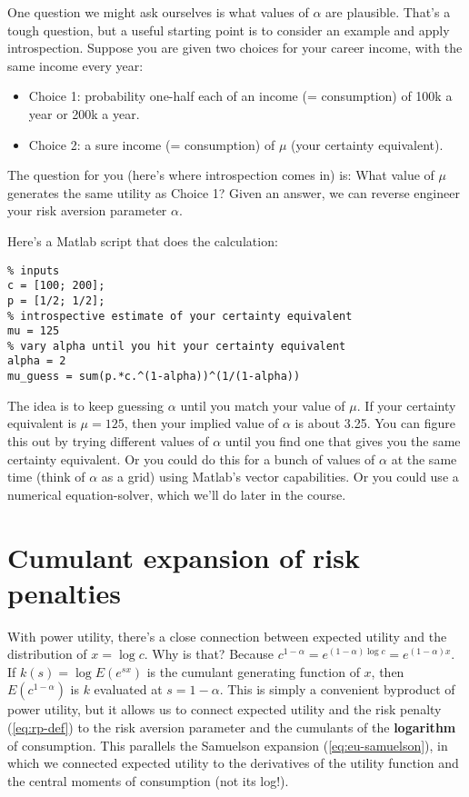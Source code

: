 \documentclass[11pt]{article}
\begin{document}
One question we might ask ourselves is what values of $\alpha$ are plausible.
That's a tough question,
but a useful starting point is to consider an example and apply introspection.
Suppose you are given two choices for your career income, with the same
income every year:
\begin{itemize}
\item Choice 1:  probability one-half each of an income (= consumption)
of 100k a year or 200k a year.
\item Choice 2:  a sure income (= consumption) of $\mu$ (your certainty equivalent).
\end{itemize}
The question for you (here's where introspection comes in) is:
What value of $\mu$ generates the same utility as Choice 1?
Given an answer, we can reverse engineer your risk aversion
parameter $\alpha$.

Here's a Matlab script that does the calculation:
\begin{verbatim}
% inputs
c = [100; 200];
p = [1/2; 1/2];
% introspective estimate of your certainty equivalent
mu = 125
% vary alpha until you hit your certainty equivalent
alpha = 2
mu_guess = sum(p.*c.^(1-alpha))^(1/(1-alpha))
\end{verbatim}
The idea is to keep guessing $\alpha$ until you match your value of $\mu$.
If your certainty equivalent is $\mu = 125$, then
your implied value of $\alpha$ is about 3.25.
You can figure this out by trying different values of $\alpha$
until you find one that gives you the same certainty equivalent.
Or you could do this for a bunch of values of $\alpha$ at the same time
(think of $\alpha$ as a grid)
using Matlab's vector capabilities.
Or you could use a numerical equation-solver,
which we'll do later in the course.


\section{Cumulant expansion of risk penalties}

With power utility, there's a close connection between expected
utility and the distribution of $ x = \log c$.
Why is that?
Because $c^{1-\alpha} = e^{(1-\alpha) \log c} = e^{(1-\alpha) x }$.
If $k(s) = \log E (e^{sx})$ is the cumulant generating function of $x$,
then $E(c^{1-\alpha})$  is $k$ evaluated at $ s = 1-\alpha$.
This is simply a convenient byproduct of  power utility,
but it allows us to connect expected utility and the risk penalty (\ref{eq:rp-def})
to the risk aversion parameter and the cumulants of the {\bf logarithm} of consumption.
This parallels the Samuelson expansion (\ref{eq:eu-samuelson}),
in which we connected expected utility to the derivatives of the utility function
and the central moments of consumption (not its log!).
\end{document}
